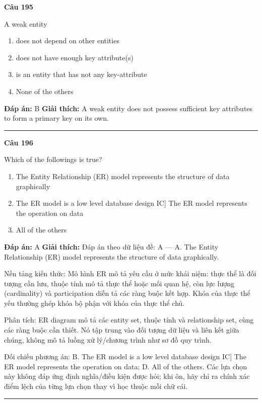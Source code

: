 \documentclass[11pt,a4paper]{article}
\newenvironment{question}[1]{%
  \par\vspace{1em}\noindent\textbf{\large Câu #1}\par\vspace{0.4em}
}{%
  \par\vspace{1em}\hrule\vspace{0.6em}
}
\newenvironment{choices}{%
  \begin{enumerate}[label=\textbf{\Alph*.},leftmargin=2.2em,itemsep=2pt,topsep=3pt]
}{%
  \end{enumerate}
}
\newcommand{\choice}{\item}
\begin{document}
\begin{question}{195}
A weak entity
\begin{choices}
\choice does not depend on other entities
\choice does not have enough key attribute(s)
\choice is an entity that has not any key-attribute
\choice None of the others
\end{choices}
\textbf{Đáp án:} B
\textbf{Giải thích:} A weak entity does not possess sufficient key attributes to form a primary key on its own.
\end{question}

\begin{question}{196}
Which of the followings is true?
\begin{choices}
\choice The Entity Relationship (ER) model represents the structure of data graphically
\choice The ER model is a low level database design
IC]
The ER model represents the operation on data
\choice All of the others
\end{choices}
\textbf{Đáp án:} A
\textbf{Giải thích:} Đáp án theo dữ liệu đề: A — A. The Entity Relationship (ER) model represents the structure of data graphically.

Nền tảng kiến thức: Mô hình ER mô tả yêu cầu ở mức khái niệm: thực thể là đối tượng cần lưu, thuộc tính mô tả thực thể hoặc mối quan hệ, còn lực lượng (cardinality) và participation diễn tả các ràng buộc kết hợp. Khóa của thực thể yếu thường ghép khóa bộ phận với khóa của thực thể chủ.

Phân tích: ER diagram mô tả các entity set, thuộc tính và relationship set, cùng các ràng buộc cần thiết. Nó tập trung vào đối tượng dữ liệu và liên kết giữa chúng, không mô tả luồng xử lý/chương trình như sơ đồ quy trình.

Đối chiếu phương án: B. The ER model is a low level database design IC] The ER model represents the operation on data; D. All of the others. Các lựa chọn này không đáp ứng định nghĩa/điều kiện được hỏi; khi ôn, hãy chỉ ra chính xác điểm lệch của từng lựa chọn thay vì học thuộc mỗi chữ cái.
\end{question}
\end{document}
